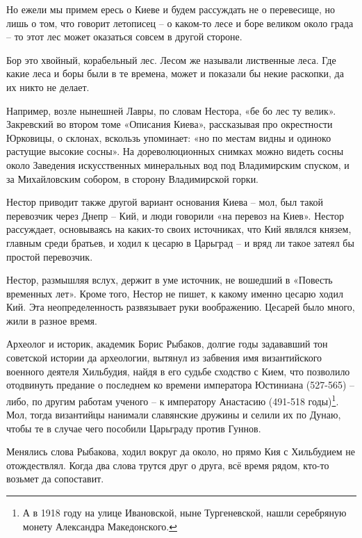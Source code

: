 


Но ежели мы примем ересь о Киеве и будем рассуждать не о перевесище, но лишь о том, что говорит летописец – о каком-то лесе и боре великом около града – то этот лес может оказаться совсем в другой стороне.

Бор это хвойный, корабельный лес. Лесом же называли лиственные леса. Где какие леса и боры были в те времена, может и показали бы некие раскопки, да их никто не делает. 

Например, возле нынешней Лавры, по словам Нестора, «бе бо лес ту велик». Закревский во втором томе «Описания Киева»\cite{zakr01}, рассказывая про окрестности Юрковицы, о склонах, вскользь упоминает: «но по местам видны и одиноко растущие высокие сосны». На дореволюционных снимках можно видеть сосны около Заведения искусственных минеральных вод под Владимирским спуском, и за Михайловским собором, в сторону Владимирской горки.

Нестор приводит также другой вариант основания Киева – мол, был такой перевозчик через Днепр – Кий, и люди говорили  «на перевоз на Киев». Нестор рассуждает, основываясь на каких-то своих источниках, что Кий являлся князем, главным среди братьев, и ходил к цесарю в Царьград – и вряд ли такое затеял бы простой перевозчик. 

Нестор, размышляя вслух, держит в уме источник, не вошедший в «Повесть временных лет». Кроме того, Нестор не пишет, к какому именно цесарю ходил Кий. Эта неопределенность развязывает руки воображению. Цесарей было много, жили в разное время.

Археолог и историк, академик Борис Рыбаков, долгие годы задававший тон советской истории да археологии, вытянул из забвения имя византийского военного деятеля Хильбудия, найдя в его судьбе сходство с Кием, что позволило отодвинуть предание о последнем ко времени императора Юстиниана (527-565) – либо, по другим работам ученого – к императору Анастасию (491-518 годы)\footnote{А в 1918 году на улице Ивановской, ныне Тургеневской, нашли серебряную монету Александра Македонского.}. Мол, тогда византийцы нанимали славянские дружины и селили их по Дунаю, чтобы те в случае чего пособили Царьграду против Гуннов.

Менялись слова Рыбакова, ходил вокруг да около, но прямо Кия с Хильбудием не отождествлял. Когда два слова трутся друг о друга, всё время рядом, кто-то возьмет да сопоставит.
